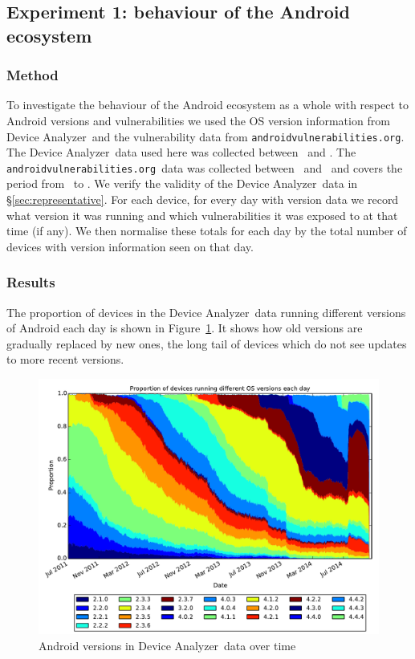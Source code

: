 \documentclass[conference,a4paper,twoside]{IEEEtran}
\newcommand{\da}{Device Analyzer}
\newcommand{\avo}{\texttt{androidvulnerabilities.org}}
\begin{document}

\subsection{Experiment 1: behaviour of the Android ecosystem}\label{sec:exp:android_ecosystem}

\subsubsection{Method}
To investigate the behaviour of the Android ecosystem as a whole with respect to Android versions and vulnerabilities we used the OS version information from \da\ and the vulnerability data from \avo.
The \da\ data used here was collected between \daStartDate\ and \daEndDate.
The \avo\ data was collected between \avoStartDate\ and \avoEndDate\ and covers the period from \avoFirstDataDate\ to \avoLastDataDate.
We verify the validity of the \da\ data in \S\ref{sec:representative}.
For each device, for every day with version data we record what version it was running and which vulnerabilities it was exposed to at that time (if any).
We then normalise these totals for each day by the total number of devices with version information seen on that day.

\subsubsection{Results}
The proportion of devices in the \da\ data running different versions of Android each day is shown in Figure~\ref{fig:norm_os}.
It shows how old versions are gradually replaced by new ones, the long tail of devices which do not see updates to more recent versions.

\begin{figure}
 \centering
 \includegraphics[width=\columnwidth]{figures/da_norm_os}
 \caption{Android versions in \da\ data over time}
 \label{fig:norm_os}
\end{figure}
\end{document}
